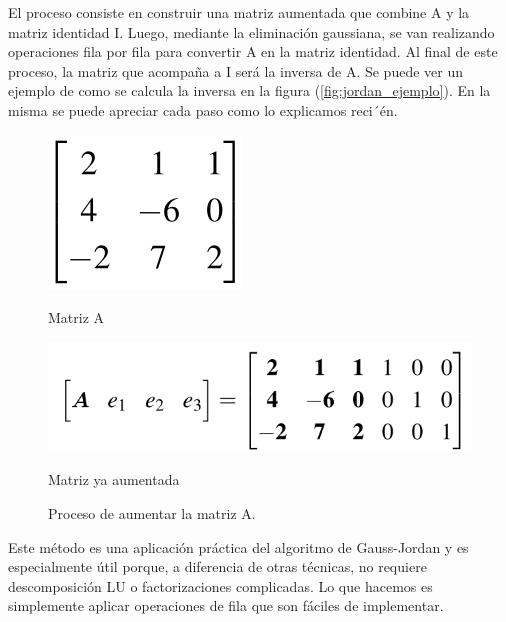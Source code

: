 El proceso consiste en construir una matriz aumentada que combine A y la matriz identidad I. Luego, mediante la eliminación gaussiana, se van realizando operaciones fila por fila para convertir A en la matriz identidad. Al final de este proceso, la matriz que acompaña a I será la inversa de A. Se puede ver un ejemplo de como se calcula la inversa en la figura (\ref{fig:jordan_ejemplo}). En la misma se puede apreciar cada paso como lo explicamos reci´én.

\begin{figure}[]
    \centering
    \begin{minipage}{0.15\linewidth}
        \includegraphics[width=\linewidth]{img/matriz-a-aumentar.png}
        \caption{Matriz A}
    \end{minipage}
  \begin{minipage}{0.3\linewidth}
      \includegraphics[width=\linewidth]{img/matriz-aumentada.png}
      \caption{Matriz ya aumentada}
  \end{minipage}
  \caption{Proceso de aumentar la matriz A.}
  \label{fig:aumentada}
\end{figure}

Este método es una aplicación práctica del algoritmo de Gauss-Jordan y es especialmente útil porque, a diferencia de otras técnicas, no requiere descomposición LU o factorizaciones complicadas. Lo que hacemos es simplemente aplicar operaciones de fila que son fáciles de implementar.

